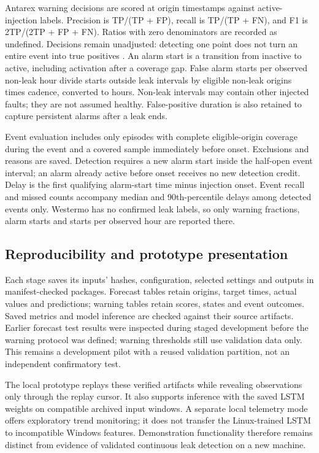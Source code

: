 \documentclass[10pt,a4paper,twocolumn]{article}
\begin{document}
Antarex warning decisions are scored at origin timestamps against active-injection labels. Precision is TP/(TP + FP), recall is TP/(TP + FN), and F1 is 2TP/(2TP + FP + FN). Ratios with zero denominators are recorded as undefined. Decisions remain unadjusted: detecting one point does not turn an entire event into true positives \cite{ref42,ref43,ref44}. An alarm start is a transition from inactive to active, including activation after a coverage gap. False alarm starts per observed non-leak hour divide starts outside leak intervals by eligible non-leak origins times cadence, converted to hours. Non-leak intervals may contain other injected faults; they are not assumed healthy. False-positive duration is also retained to capture persistent alarms after a leak ends.

Event evaluation includes only episodes with complete eligible-origin coverage during the event and a covered sample immediately before onset. Exclusions and reasons are saved. Detection requires a new alarm start inside the half-open event interval; an alarm already active before onset receives no new detection credit. Delay is the first qualifying alarm-start time minus injection onset. Event recall and missed counts accompany median and 90th-percentile delays among detected events only. Westermo has no confirmed leak labels, so only warning fractions, alarm starts and starts per observed hour are reported there.

\subsection{Reproducibility and prototype presentation}

Each stage saves its inputs' hashes, configuration, selected settings and outputs in manifest-checked packages. Forecast tables retain origins, target times, actual values and predictions; warning tables retain scores, states and event outcomes. Saved metrics and model inference are checked against their source artifacts. Earlier forecast test results were inspected during staged development before the warning protocol was defined; warning thresholds still use validation data only. This remains a development pilot with a reused validation partition, not an independent confirmatory test.

The local prototype replays these verified artifacts while revealing observations only through the replay cursor. It also supports inference with the saved LSTM weights on compatible archived input windows. A separate local telemetry mode offers exploratory trend monitoring; it does not transfer the Linux-trained LSTM to incompatible Windows features. Demonstration functionality therefore remains distinct from evidence of validated continuous leak detection on a new machine.
\end{document}
